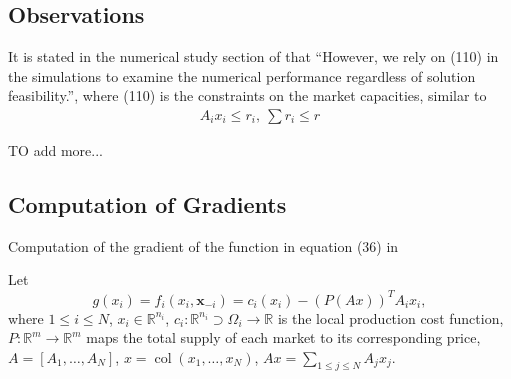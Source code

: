 
\subsection*{Observations}

It is stated in the numerical study section of \cite{Yu_2017} that ``However, we rely on (110) in the simulations to examine the numerical performance regardless of solution feasibility.'', where (110) is the constraints on the market capacities, similar to
\begin{align*}
A_i x_i \leqslant r_i, ~ \sum r_i \leqslant r
\end{align*}

TO add more...

\subsection*{Computation of Gradients}

Computation of the gradient of the function in equation (36) in \citep{Yi_2019}

Let
$$g(x_i) = f_i(x_i, \mathbf{x}_{-i}) = c_i(x_i) - (P(Ax))^T A_ix_i,$$
where $1 \leqslant i \leqslant N$, $x_i \in \mathbb{R}^{n_i}$, $c_i: \mathbb{R}^{n_i} \supset \Omega_i \to \mathbb{R}$ is the local production cost function, $P: \mathbb{R}^m \to \mathbb{R}^m$ maps the total supply of each market to its corresponding price, $A = [A_1, \ldots, A_N]$, $x = \operatorname{col}(x_1, \ldots, x_N)$, $Ax = \sum\limits_{1 \leqslant j \leqslant N} A_jx_j$. 


